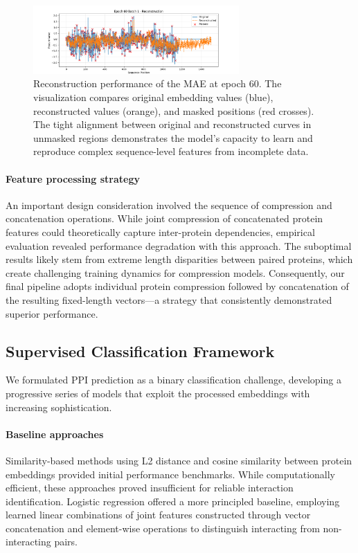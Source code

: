 \documentclass{article}
\begin{document}
	\begin{figure}[h]
		\centering
		\includegraphics[width=0.7\textwidth]{imgs/epoch60_batch1.png}
		\caption{Reconstruction performance of the MAE at epoch 60. The visualization compares original embedding values (blue), reconstructed values (orange), and masked positions (red crosses). The tight alignment between original and reconstructed curves in unmasked regions demonstrates the model's capacity to learn and reproduce complex sequence-level features from incomplete data.}
		\label{fig:mae_recon}
	\end{figure}
	
	\paragraph{Feature processing strategy} An important design consideration involved the sequence of compression and concatenation operations. While joint compression of concatenated protein features could theoretically capture inter-protein dependencies, empirical evaluation revealed performance degradation with this approach. The suboptimal results likely stem from extreme length disparities between paired proteins, which create challenging training dynamics for compression models. Consequently, our final pipeline adopts individual protein compression followed by concatenation of the resulting fixed-length vectors—a strategy that consistently demonstrated superior performance.
	
	
	\subsection{Supervised Classification Framework}

	We formulated PPI prediction as a binary classification challenge, developing a progressive series of models that exploit the processed embeddings with increasing sophistication.

	\paragraph{Baseline approaches} Similarity-based methods using L2 distance and cosine similarity between protein embeddings provided initial performance benchmarks. While computationally efficient, these approaches proved insufficient for reliable interaction identification. Logistic regression offered a more principled baseline, employing learned linear combinations of joint features constructed through vector concatenation and element-wise operations to distinguish interacting from non-interacting pairs.
\end{document}
